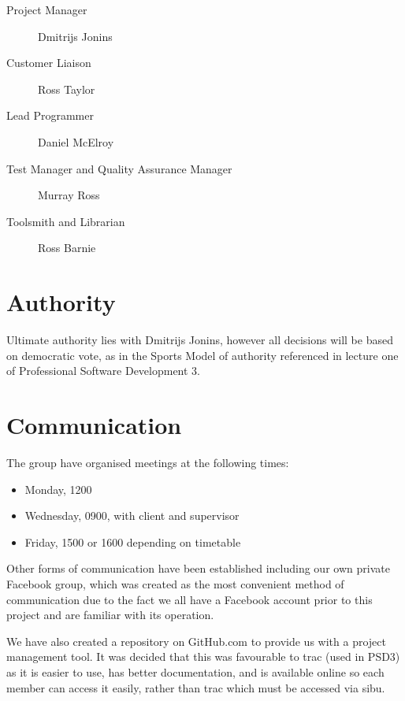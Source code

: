 \documentclass{l3deliverable}
\begin{document}
\begin{description}
  \item[Project Manager] Dmitrijs Jonins
  \item[Customer Liaison] Ross Taylor
  \item[Lead Programmer] Daniel McElroy
  \item[Test Manager and Quality Assurance Manager] Murray Ross
  \item[Toolsmith and Librarian] Ross Barnie
\end{description}


\section{Authority}

Ultimate authority lies with Dmitrijs Jonins, however all decisions will be 
based on democratic vote, as in the Sports Model of authority referenced in
lecture one of Professional Software Development 3.


\section{Communication}

The group have organised meetings at the following times:

\begin{itemize}
\item{Monday, 1200}
\item{Wednesday, 0900, with client and supervisor}
\item{Friday, 1500 or 1600 depending on timetable}
\end{itemize}

Other forms of communication have been established including our own
private Facebook group, which was created as the most convenient method
of communication due to the fact we all have a Facebook account prior to
this project and are familiar with its operation.
 
We have also created a repository on GitHub.com to provide us with a project 
management tool. 
It was decided that this was favourable to trac (used in PSD3) as it is easier
to use, has better documentation, and is available online so each member can
access it easily, rather than trac which must be accessed via sibu.
\end{document}
